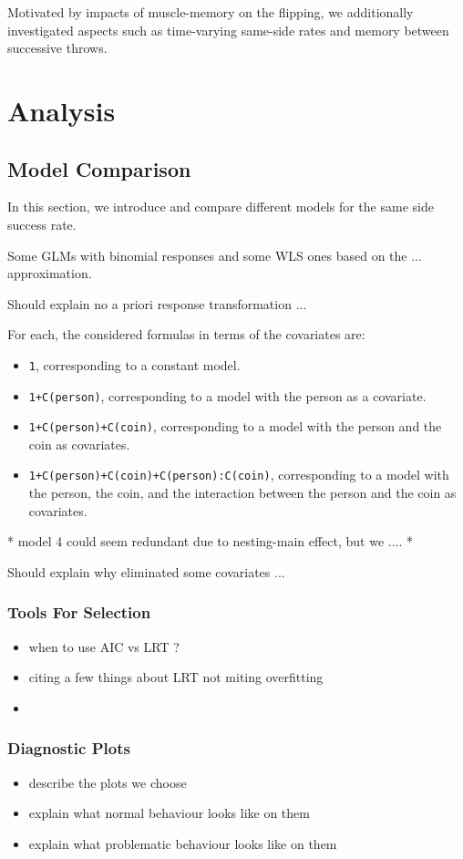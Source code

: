 \documentclass[a4paper, 12pt,oneside]{article}
\begin{document}
		Motivated by impacts of muscle-memory on the flipping, we additionally investigated aspects such as time-varying same-side rates and memory between successive throws.
	\section{Analysis}
		\subsection{Model Comparison}
			In this section, we introduce and compare different models for the same side success rate. 

			Some GLMs with binomial responses and some WLS ones based on the ... approximation.
			
			Should explain no a priori response transformation ...
			
			For each, the considered formulas in terms of the covariates are:
			\begin{itemize}
				\item \texttt{1}, corresponding to a constant model.
				\item \texttt{1+C(person)}, corresponding to a model with the person as a covariate.
				\item \texttt{1+C(person)+C(coin)}, corresponding to a model with the person and the coin as covariates.
				\item \texttt{1+C(person)+C(coin)+C(person):C(coin)}, corresponding to a model with the person, the coin, and the interaction between the person and the coin as covariates.
			\end{itemize}
			* model 4 could seem redundant due to nesting-main effect, but we ....
			*  

			Should explain why eliminated some covariates ...
			\subsubsection{Tools For Selection}
			\begin{itemize}
				\item when to use AIC vs LRT ?
				\item citing a few things about LRT not miting overfitting 
				\item 
			\end{itemize}
			\subsubsection{Diagnostic Plots}
			\begin{itemize}
				\item describe the plots we choose 
				\item explain what normal behaviour looks like on them
				\item explain what problematic behaviour looks like on them
			\end{itemize}
\end{document}
